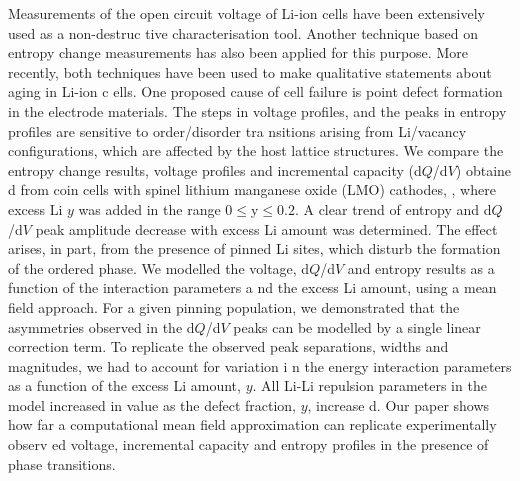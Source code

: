                          
Measurements of the open circuit voltage of Li-ion cells have been extensively used as a non-destruc
tive characterisation tool.                                                                         
Another technique based on entropy change measurements has also been applied for this purpose.      
More recently, both techniques have been used to make qualitative statements about aging in Li-ion c
ells.                                                                                               
One proposed cause of cell failure is point defect formation in the electrode materials.            
The steps in voltage profiles, and the peaks in entropy profiles are sensitive to order/disorder tra
nsitions arising from Li/vacancy configurations, which are affected by the host lattice structures. 
We compare the entropy change results, voltage profiles and incremental capacity (d$Q$/d$V$) obtaine
d from coin cells with spinel lithium manganese oxide (LMO) cathodes, ,     
where excess Li $y$ was added in the range $0 \leq $y$ \leq 0.2$.                                   
A clear trend of entropy and d$Q$/d$V$ peak amplitude decrease with excess Li amount was determined.
The effect arises, in part, from the presence of pinned Li sites, which disturb the formation of the
 ordered phase.                                                                                     
We modelled the voltage, d$Q$/d$V$ and entropy results as a function of the interaction parameters a
nd the excess Li amount, using a mean field approach.                                               
For a given pinning population, we demonstrated that the asymmetries observed in the d$Q$/d$V$ peaks
 can be modelled by a single linear correction term.                                                
To replicate the observed peak separations, widths and magnitudes, we had to account for variation i
n the energy interaction parameters as a function of the excess Li amount, $y$.                     
All Li-Li repulsion parameters in the model increased in value as the defect fraction, $y$, increase
d.                                                                                                  
Our paper shows how far a computational mean field approximation can replicate experimentally observ
ed voltage, incremental capacity and entropy profiles in the presence of phase transitions.